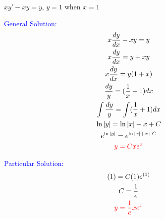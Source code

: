\item $xy' - xy = y$, $y = 1$ when $x = 1$

\textcolor{blue}{
    \begin{minipage}[t]{0.45\textwidth}
        General Solution:
        \begin{gather*}
        x\frac{dy}{dx} - xy = y\\
        x\frac{dy}{dx}  = y+xy\\
        x\frac{dy}{dx}  = y(1+x)\\
        \frac{dy}{y}  = (\frac{1}{x}+1)dx\\
        \int\frac{dy}{y}  = \int(\frac{1}{x}+1)dx\\
        \ln|y| = \ln|x|+x+C \\
        e^{\ln|y|} = e^{\ln|x|+x+C}\\
        \textcolor{red}{
        y=Cxe^x
        }
        \end{gather*}
    \end{minipage}
    \hfill
    \begin{minipage}[t]{0.45\textwidth}
        Particular Solution:
        \begin{gather*}
            (1)=C(1)e^{(1)}\\
            C=\frac{1}{e}\\
            \textcolor{red}{
            y=\frac{1}{e}xe^x
            }
        \end{gather*}
    \end{minipage}
}